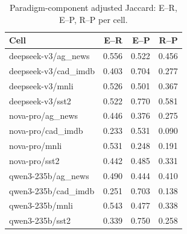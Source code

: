 \begin{table}[t]
\centering
\caption{Paradigm-component adjusted Jaccard: E--R, E--P, R--P per cell.}
\label{tab:paradigms}
\begin{tabular}{lrrr}
\toprule
Cell & E--R & E--P & R--P \\
\midrule
deepseek-v3/ag_news & 0.556 & 0.522 & 0.456 \\
deepseek-v3/cad_imdb & 0.403 & 0.704 & 0.277 \\
deepseek-v3/mnli & 0.526 & 0.501 & 0.367 \\
deepseek-v3/sst2 & 0.522 & 0.770 & 0.581 \\
nova-pro/ag_news & 0.446 & 0.376 & 0.275 \\
nova-pro/cad_imdb & 0.233 & 0.531 & 0.090 \\
nova-pro/mnli & 0.531 & 0.248 & 0.191 \\
nova-pro/sst2 & 0.442 & 0.485 & 0.331 \\
qwen3-235b/ag_news & 0.490 & 0.444 & 0.410 \\
qwen3-235b/cad_imdb & 0.251 & 0.703 & 0.138 \\
qwen3-235b/mnli & 0.543 & 0.477 & 0.338 \\
qwen3-235b/sst2 & 0.339 & 0.750 & 0.258 \\
\bottomrule
\end{tabular}
\end{table}
